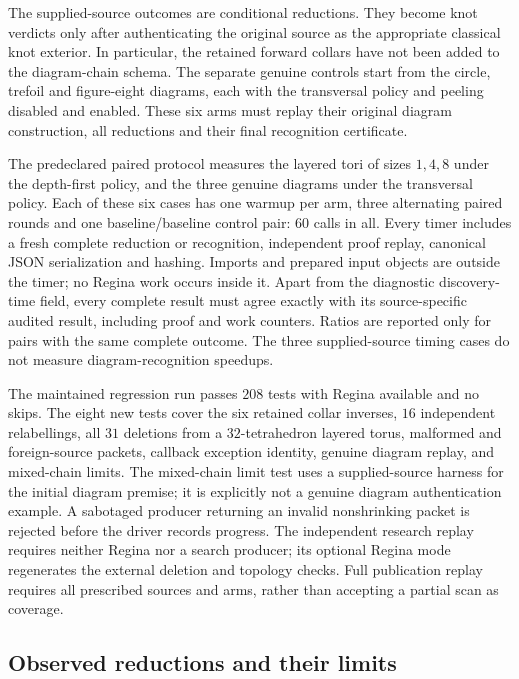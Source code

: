 The supplied-source outcomes are conditional reductions.  They become
knot verdicts only after authenticating the original source as the
appropriate classical knot exterior.  In particular, the retained
forward collars have not been added to the diagram-chain schema.
The separate genuine controls start from the circle, trefoil and
figure-eight diagrams, each with the transversal policy and peeling
disabled and enabled.  These six arms must replay their original
diagram construction, all reductions and their final recognition
certificate.

The predeclared paired protocol measures the layered tori of sizes
$1,4,8$ under the depth-first policy, and the three genuine diagrams
under the transversal policy.  Each of these six cases has one warmup
per arm, three alternating paired rounds and one baseline/baseline
control pair: $60$ calls in all.  Every timer includes a fresh complete
reduction or recognition, independent proof replay, canonical JSON
serialization and hashing.  Imports and prepared input objects are
outside the timer; no Regina work occurs inside it.  Apart from the
diagnostic discovery-time field, every complete result must agree
exactly with its source-specific audited result, including proof and
work counters.  Ratios are reported only for pairs with the same
complete outcome.  The three supplied-source timing cases do not
measure diagram-recognition speedups.

The maintained regression run passes $208$ tests with Regina available
and no skips.  The eight new tests cover the six retained collar
inverses, $16$ independent relabellings, all $31$ deletions from a
$32$-tetrahedron layered torus, malformed and foreign-source packets,
callback exception identity, genuine diagram replay, and mixed-chain
limits.  The mixed-chain limit test uses a supplied-source harness for
the initial diagram premise; it is explicitly not a genuine diagram
authentication example.  A sabotaged producer returning an invalid
nonshrinking packet is rejected before the driver records progress.
The independent research replay requires neither Regina nor a search
producer; its optional Regina mode regenerates the external deletion
and topology checks.  Full publication replay requires all prescribed
sources and arms, rather than accepting a partial scan as coverage.

\subsection{Observed reductions and their limits}

